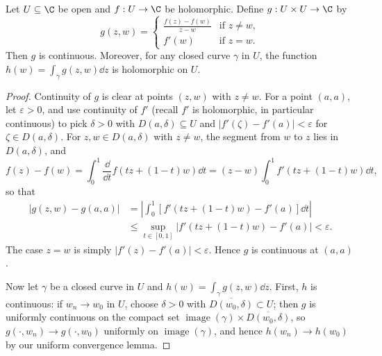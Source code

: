 \begin{lemma}
    Let $U \subseteq \C$ be open and $f: U \rightarrow \C$ be holomorphic. Define $g: U \times U \rightarrow \C$ by
    $$
    g(z, w) = \begin{cases}
        \frac{f(z) - f(w)}{z - w} &\mbox{if } z \neq w, \\
        f'(w) &\mbox{if } z = w.
       \end{cases}
    $$
    Then $g$ is continuous. Moreover, for any closed curve $\gamma$ in $U$, the function $h(w) = \int_\gamma g(z, w) \dd z$ is holomorphic on $U$.
\end{lemma}
\begin{proof}
    Continuity of $g$ is clear at points $(z, w)$ with $z \neq w$. For a point $(a, a)$, let $\varepsilon > 0$, and use continuity of $f'$ (recall $f'$ is holomorphic, in particular continuous) to pick $\delta > 0$ with $D(a, \delta) \subseteq U$ and $|f'(\zeta) - f'(a)| < \varepsilon$ for $\zeta \in D(a, \delta)$. For $z, w \in D(a, \delta)$ with $z \neq w$, the segment from $w$ to $z$ lies in $D(a, \delta)$, and
    $$
    f(z) - f(w) = \int_0^1 \frac{\dd}{\dd t} f(tz + (1 - t)w) \dd t = (z - w)\int_0^1 f'(tz + (1 - t)w) \dd t,
    $$
    so that
    \begin{align*}
    |g(z, w) - g(a, a)| &= \left|\int_0^1 \left[f'(tz + (1 - t)w) - f'(a)\right] \dd t \right| \\
    &\leq \sup_{t \in [0, 1]}|f'(tz + (1-t)w) - f'(a)| < \varepsilon.
    \end{align*}
    The case $z = w$ is simply $|f'(z) - f'(a)| < \varepsilon$. Hence $g$ is continuous at $(a, a)$.

    Now let $\gamma$ be a closed curve in $U$ and $h(w) = \int_\gamma g(z, w) \dd z$. First, $h$ is continuous: if $w_n \rightarrow w_0$ in $U$, choose $\delta > 0$ with $\overline{D(w_0, \delta)} \subset U$; then $g$ is uniformly continuous on the compact set $\operatorname{image}(\gamma) \times \overline{D(w_0, \delta)}$, so $g(\cdot, w_n) \rightarrow g(\cdot, w_0)$ uniformly on $\operatorname{image}(\gamma)$, and hence $h(w_n) \rightarrow h(w_0)$ by our uniform convergence lemma.


\end{proof}
